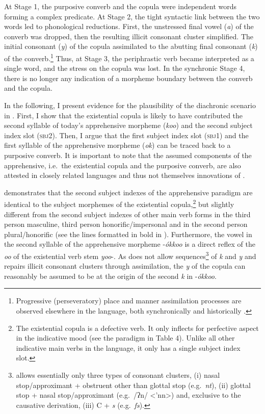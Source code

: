 \documentclass[output=paper,colorlinks,citecolor=brown,]{langscibook}
\begin{document}
At Stage 1, the purposive converb and the copula were independent words forming a complex predicate. At Stage 2, the tight syntactic link between the two words led to phonological reductions. First, the unstressed final vowel (\textit{a}) of the converb was dropped, then the resulting illicit consonant cluster simplified. The initial consonant (\textit{y}) of the copula assimilated to the abutting final consonant (\textit{k}) of the converb.\footnote{Progressive (perseveratory) place and manner assimilation processes are observed elsewhere in the language, both synchronically and historically \citep[65, 71]{Treis2008}.} Thus, at Stage 3, the periphrastic verb became interpreted as a single word, and the stress on the copula was lost. In the synchronic Stage 4, there is no longer any indication of a morpheme boundary between the converb and the copula.

In the following, I present evidence for the plausibility of the diachronic scenario in . First, I show that the existential copula is likely to have contributed the second syllable of today's apprehensive morpheme (\textit{koo}) and the second subject index slot (\textsc{sbj2}). Then, I argue that the first subject index slot (\textsc{sbj1}) and the first syllable of the apprehensive morpheme (\textit{ok}) can be traced back to a purposive converb. It is important to note that the assumed components of the apprehensive,  i.e.\ the existential copula and the purposive converb, are also attested in closely related  languages and thus not themselves innovations of .

\largerpage[-1]
 demonstrates that the second subject indexes of the apprehensive paradigm are identical to the subject morphemes of the existential copula,\footnote{The existential copula is a defective verb. It only inflects for perfective aspect in the indicative mood (see the paradigm in Table 4). Unlike all other indicative main verbs in the language, it only has a single subject index slot.} but slightly different from the second subject indexes of other main verb forms in the third person masculine, third person honorific\slash impersonal and in the second person plural\slash honorific (see the lines formatted in bold in ). Furthermore, the vowel in the second syllable of the apprehensive morpheme \nobreakdash-\textit{ókkoo} is a direct reflex of the \textit{oo} of the existential verb stem \textit{yoo}-. As  does not allow sequences\footnote{ allows essentially only three types of consonant clusters, (i) nasal stop\slash approximant + obstruent other than glottal stop (e.g.\ \textit{nt}), (ii) glottal stop + nasal stop\slash approximant (e.g.\ /ʔn/ <'nn>) and, exclusive to the causative derivation, (iii) C + \textit{s} (e.g.\ \textit{fs}).} of \textit{k} and \textit{y} and repairs illicit consonant clusters through assimilation, the \textit{y} of the copula can reasonably be assumed to be at the origin of the second \textit{k} in \nobreakdash-\textit{ókkoo}.
\end{document}
